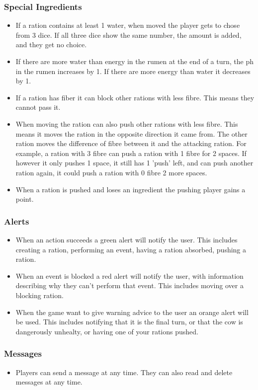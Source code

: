 	\subsubsection{Special Ingredients}
	  \begin{itemize}
	  	\item \pA If a ration contains at least 1 water, when moved the player gets to chose from 3 dice. If all three dice show the same number, the amount is added, and they get no choice.
	  	\item \pA If there are more water than energy in the rumen at the end of a turn, the ph in the rumen increases by 1. If there are more energy than water it decreases by 1.
	  	\item \pA If a ration has fiber it can block other rations with less fibre. This means they cannot pass it. 
	  	\item \pB When moving the ration can also push other rations with less fibre. This means it moves the ration in the opposite direction it came from. The other ration moves the difference of fibre between it and the attacking ration. For example, a ration with 3 fibre can push a ration with 1 fibre for 2 spaces. If however it only pushes 1 space, it still has 1 'push' left, and can push another ration again, it could push a ration with 0 fibre 2 more spaces.
	  	\item \pB When a ration is pushed and loses an ingredient the pushing player gains a point.
	  \end{itemize}
	\subsubsection{Alerts}
	  \begin{itemize}
	  	\item \pB When an action succeeds a green alert will notify the user. This includes creating a ration, performing an event, having a ration absorbed, pushing a ration.
	  	\item \pB When an event is blocked a red alert will notify the user, with information describing why they can't perform that event. This includes moving over a blocking ration.
	  	\item \pB When the game want to give warning advice to the user an orange alert will be used. This includes notifying that it is the final turn, or that the cow is dangerously unhealty, or having one of your rations pushed.
	  \end{itemize}
	\subsubsection{Messages}
	  \begin{itemize}
	  	\item \pD Players can send a message at any time. They can also read and delete messages at any time.
	  \end{itemize}

